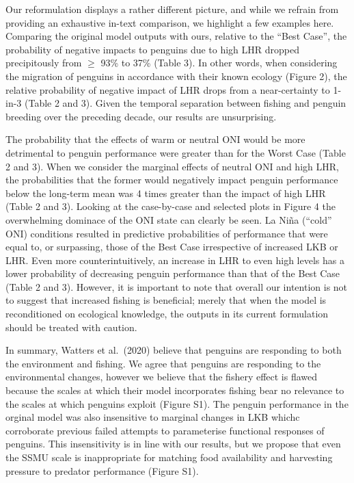 \documentclass[]{elsarticle} %
\begin{document}
Our reformulation displays a rather different picture, and while we
refrain from providing an exhaustive in-text comparison, we highlight a
few examples here. Comparing the original model outputs with ours,
relative to the ``Best Case'', the probability of negative impacts to
penguins due to high LHR dropped precipitously from \(\geqslant\) 93\%
to 37\% (Table 3). In other words, when considering the migration of
penguins in accordance with their known ecology (Figure 2), the relative
probability of negative impact of LHR drops from a near-certainty to
1-in-3 (Table 2 and 3). Given the temporal separation between fishing
and penguin breeding over the preceding decade, our results are
unsurprising.

The probability that the effects of warm or neutral ONI would be more
detrimental to penguin performance were greater than for the Worst Case
(Table 2 and 3). When we consider the marginal effects of neutral ONI
and high LHR, the probabilities that the former would negatively impact
penguin performance below the long-term mean was 4 times greater than
the impact of high LHR (Table 2 and 3). Looking at the case-by-case and
selected plots in Figure 4 the overwhelming dominace of the ONI state
can clearly be seen. La Niña (``cold'' ONI) conditions resulted in
predictive probabilities of performance that were equal to, or
surpassing, those of the Best Case irrespective of increased LKB or LHR.
Even more counterintuitively, an increase in LHR to even high levels has
a lower probability of decreasing penguin performance than that of the
Best Case (Table 2 and 3). However, it is important to note that overall
our intention is not to suggest that increased fishing is beneficial;
merely that when the model is reconditioned on ecological knowledge, the
outputs in its current formulation should be treated with caution.

In summary, Watters et al.~(2020) believe that penguins are responding
to both the environment and fishing. We agree that penguins are
responding to the environmental changes, however we believe that the
fishery effect is flawed because the scales at which their model
incorporates fishing bear no relevance to the scales at which penguins
exploit (Figure S1). The penguin performance in the orginal model was
also insensitive to marginal changes in LKB whichc corroborate previous
failed attempts to parameterise functional responses of penguins. This
insensitivity is in line with our results, but we propose that even the
SSMU scale is inappropriate for matching food availability and
harvesting pressure to predator performance (Figure S1).
\end{document}
